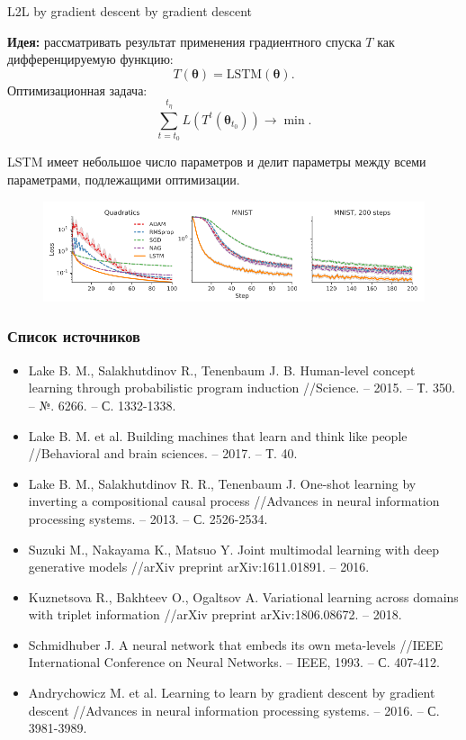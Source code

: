\documentclass[usenames,dvipsnames,10pt,pdf,utf8,russian,aspectratio=43]{beamer}
\begin{document}
\begin{frame}{L2L by gradient descent by gradient descent}

\textbf{Идея: } рассматривать результат применения градиентного спуска $T$ как дифференцируемую функцию:
\[
    T(\boldsymbol{\theta}) = \text{LSTM}(\boldsymbol{\theta}).
\]
Оптимизационная задача:
\[
    \sum_{t=t_0}^{t_\eta} L\left(T^t(\boldsymbol{\theta}_{t_0})\right) \to \min.
\]

LSTM имеет небольшое число параметров и делит параметры между всеми параметрами, подлежащими оптимизации.

\begin{figure}
\includegraphics[width=\textwidth]{sgd_by_sgd.png}
\end{figure}
\end{frame}


\begin{frame}
\frametitle{Список источников}
\begin{itemize}
\item Lake B. M., Salakhutdinov R., Tenenbaum J. B. Human-level concept learning through probabilistic program induction //Science. – 2015. – Т. 350. – №. 6266. – С. 1332-1338.
\item Lake B. M. et al. Building machines that learn and think like people //Behavioral and brain sciences. – 2017. – Т. 40.
\item Lake B. M., Salakhutdinov R. R., Tenenbaum J. One-shot learning by inverting a compositional causal process //Advances in neural information processing systems. – 2013. – С. 2526-2534.
\item Suzuki M., Nakayama K., Matsuo Y. Joint multimodal learning with deep generative models //arXiv preprint arXiv:1611.01891. – 2016.
\item Kuznetsova R., Bakhteev O., Ogaltsov A. Variational learning across domains with triplet information //arXiv preprint arXiv:1806.08672. – 2018.
\item Schmidhuber J. A neural network that embeds its own meta-levels //IEEE International Conference on Neural Networks. – IEEE, 1993. – С. 407-412.
\item Andrychowicz M. et al. Learning to learn by gradient descent by gradient descent //Advances in neural information processing systems. – 2016. – С. 3981-3989.
\end{itemize}
\end{frame}
\end{document}
